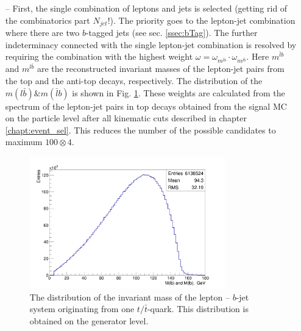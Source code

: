 \begin{itemize}

 \item [--] First, the single combination of leptons and jets is selected (getting rid of the combinatorics part $N_{jet}!$). The priority goes to
 the lepton-jet combination where there are two $b$-tagged jets (see sec. \ref{ssec:bTag}). The further indeterminacy connected with the single lepton-jet
 combination is resolved by requiring the combination with the highest weight $\omega = \omega_{m^{\bar{l}b}} \cdot \omega_{m^{l\bar{b}}}$. Here 
 $m^{\bar{l}b}$ and $m^{l\bar{b}}$ are the reconstructed invariant masses of the lepton-jet pairs from the top and the anti-top 
 decays, respectively. The distribution of the $m(l\bar{b}) \& m(\bar{l}b)$ is shown in Fig. \ref{fig:mlb}. 
 These weights are calculated from the spectrum of the lepton-jet pairs in top decays obtained from the signal MC on the 
 particle level after all kinematic cuts described in chapter \ref{chapt:event_sel}. This reduces the number of the possible candidates to maximum
 $100 \otimes 4$.
 
 \begin{figure}[t]
  \centering
  \includegraphics[width=0.8\textwidth]{05_kinReco/plots/mlb_distr.png}
  \caption{The distribution of the invariant mass of the lepton -- $b$-jet system originating from one $t/\bar{t}$-quark. This distribution is obtained on the
  generator level.}
  \label{fig:mlb}
 \end{figure}
 

\end{itemize}
